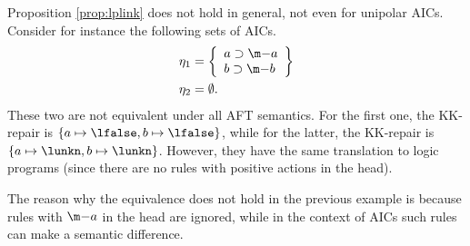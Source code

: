\begin{example}
 Proposition \ref{prop:lplink} does not hold in general, not even for unipolar AICs. 
 Consider for instance the following sets of AICs. 
 \begin{align*}\eta_1 &= \left\{\begin{array}{l}
                    a \aicrule \remove a\\
                     b  \aicrule \remove b
                   \end{array}\right\}\\
                   \eta_2 &=\emptyset.
\end{align*}
These two are not equivalent under all AFT semantics. 
For the first one, the KK-repair is $\{a\mapsto\lfalse,b\mapsto\lfalse\}$, while for the latter, the KK-repair is $\{a\mapsto\lunkn,b\mapsto\lunkn\}$. However, they have the same translation to logic programs (since there are no rules with positive actions in the head).          
%                    
% 
\end{example}

The reason why the equivalence does not hold in the previous example is because rules with $\remove a$ in the head are ignored, while in the context of AICs such rules can make a semantic difference. 

